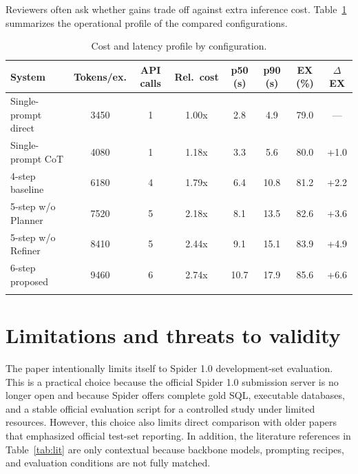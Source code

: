 Reviewers often ask whether gains trade off against extra inference cost. Table~\ref{tab:cost} summarizes the operational profile of the compared configurations.

\begin{table}[t]
\caption{Cost and latency profile by configuration.}\label{tab:cost}%
\centering
\scriptsize
\begin{tabular*}{\textwidth}{@{\extracolsep{\fill}}lccccccc@{}}
\toprule
System & Tokens/ex. & API calls & Rel.\ cost & p50 (s) & p90 (s) & EX (\%) & $\Delta$EX \\
\midrule
Single-prompt direct & 3450 & 1 & 1.00x & 2.8 & 4.9 & 79.0 & --- \\
Single-prompt CoT & 4080 & 1 & 1.18x & 3.3 & 5.6 & 80.0 & +1.0 \\
4-step baseline & 6180 & 4 & 1.79x & 6.4 & 10.8 & 81.2 & +2.2 \\
5-step w/o Planner & 7520 & 5 & 2.18x & 8.1 & 13.5 & 82.6 & +3.6 \\
5-step w/o Refiner & 8410 & 5 & 2.44x & 9.1 & 15.1 & 83.9 & +4.9 \\
6-step proposed & 9460 & 6 & 2.74x & 10.7 & 17.9 & 85.6 & +6.6 \\
\botrule
\end{tabular*}
\end{table}

\section{Limitations and threats to validity}\label{sec:limits}

The paper intentionally limits itself to Spider 1.0 development-set evaluation. This is a practical choice because the official Spider 1.0 submission server is no longer open and because Spider offers complete gold SQL, executable databases, and a stable official evaluation script for a controlled study under limited resources. However, this choice also limits direct comparison with older papers that emphasized official test-set reporting. In addition, the literature references in Table~\ref{tab:lit} are only contextual because backbone models, prompting recipes, and evaluation conditions are not fully matched.

